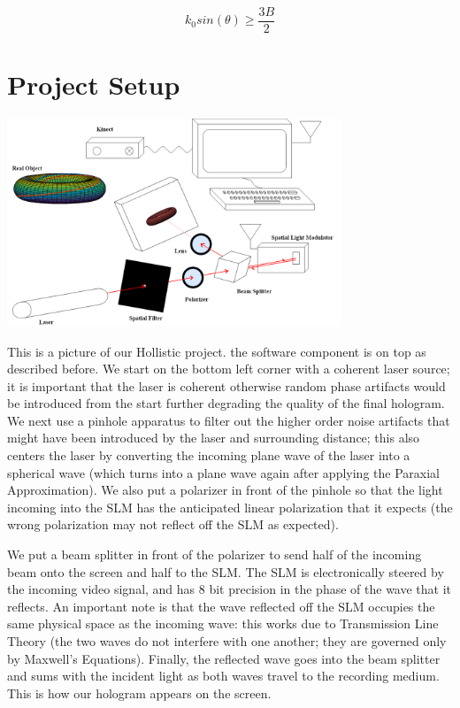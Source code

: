 \documentclass[12pt]{article}
\begin{document}
\begin{equation}
	k_{0}sin(\theta) \geq \frac{3B}{2}
\end{equation}

\section{Project Setup}

\begin{center}
\includegraphics[width=100mm]{tupac10.png}
\end{center}

This is a picture of our Hollistic project. the software component is on top as described before. We start on the bottom left corner with a coherent laser source; it is important that the laser is coherent otherwise random phase artifacts would be introduced from the start further degrading the quality of the final hologram. We next use a pinhole apparatus to filter out the higher order noise artifacts that might have been introduced by the laser and surrounding distance; this also centers the laser by converting the incoming plane wave of the laser into a spherical wave (which turns into a plane wave again after applying the Paraxial Approximation). We also put a polarizer in front of the pinhole so that the light incoming into the SLM has the anticipated linear polarization that it expects (the wrong polarization may not reflect off the SLM as expected).

We put a beam splitter in front of the polarizer to send half of the incoming beam onto the screen and half to the SLM. The SLM is electronically steered by the incoming video signal, and has 8 bit precision in the phase of the wave that it reflects. An important note is that the wave reflected off the SLM occupies the same physical space as the incoming wave: this works due to Transmission Line Theory (the two waves do not interfere with one another; they are governed only by Maxwell's Equations). Finally, the reflected wave goes into the beam splitter and sums with the incident light as both waves travel to the recording medium. This is how our hologram appears on the screen.
\end{document}
